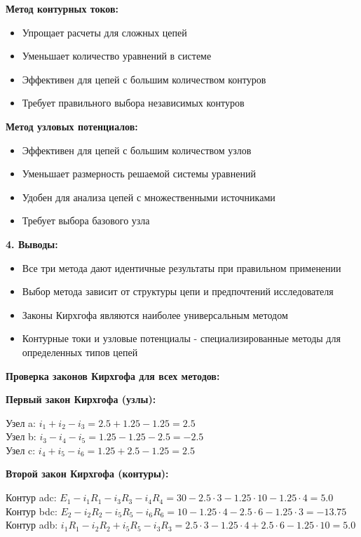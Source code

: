 \begin{flushleft}
\textbf{Метод контурных токов:}
\begin{itemize}
    \item Упрощает расчеты для сложных цепей
    \item Уменьшает количество уравнений в системе
    \item Эффективен для цепей с большим количеством контуров
    \item Требует правильного выбора независимых контуров
\end{itemize}

\textbf{Метод узловых потенциалов:}
\begin{itemize}
    \item Эффективен для цепей с большим количеством узлов
    \item Уменьшает размерность решаемой системы уравнений
    \item Удобен для анализа цепей с множественными источниками
    \item Требует выбора базового узла
\end{itemize}

\textbf{4. Выводы:}
\begin{itemize}
    \item Все три метода дают идентичные результаты при правильном применении
    \item Выбор метода зависит от структуры цепи и предпочтений исследователя
    \item Законы Кирхгофа являются наиболее универсальным методом
    \item Контурные токи и узловые потенциалы - специализированные методы для определенных типов цепей
\end{itemize}
\end{flushleft}

\textbf{Проверка законов Кирхгофа для всех методов:}

\textbf{Первый закон Кирхгофа (узлы):}
\begin{flushleft}
Узел a: $i_1 + i_2 - i_3 = 2.5 + 1.25 - 1.25 = 2.5$ \\
Узел b: $i_3 - i_4 - i_5 = 1.25 - 1.25 - 2.5 = -2.5$ \\
Узел c: $i_4 + i_5 - i_6 = 1.25 + 2.5 - 1.25 = 2.5$
\end{flushleft}

\textbf{Второй закон Кирхгофа (контуры):}
\begin{flushleft}
Контур adc: $E_1 - i_1R_1 - i_3R_3 - i_4R_4 = 30 - 2.5 \cdot 3 - 1.25 \cdot 10 - 1.25 \cdot 4 = 5.0$ \\
Контур bdc: $E_2 - i_2R_2 - i_5R_5 - i_6R_6 = 10 - 1.25 \cdot 4 - 2.5 \cdot 6 - 1.25 \cdot 3 = -13.75$ \\
Контур adb: $i_1R_1 - i_2R_2 + i_5R_5 - i_3R_3 = 2.5 \cdot 3 - 1.25 \cdot 4 + 2.5 \cdot 6 - 1.25 \cdot 10 = 5.0$
\end{flushleft}

